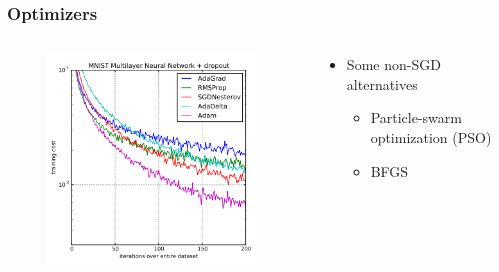 \documentclass[aspectratio=169]{beamer}
\newcommand\imageright[1]{ %
    \caption*{\scalebox{.5}{\textcolor{lightgray}{\textcopyright~#1}}} %
}
\begin{document}
\begin{frame}
\frametitle{Optimizers}

\begin{columns}
    \begin{column}{0.48\textwidth}
        \begin{figure}
            \includegraphics[width=\linewidth]{optimizers.png}
            \imageright{Machine Learning Mastery}
        \end{figure}
    \end{column}
    \begin{column}{0.48\textwidth}
        \begin{itemize}
            \item Some non-SGD alternatives
            \begin{itemize}
                \item Particle-swarm optimization (PSO)
                \item BFGS
            \end{itemize}
        \end{itemize}
    \end{column}
\end{columns}
\end{frame}
\end{document}
